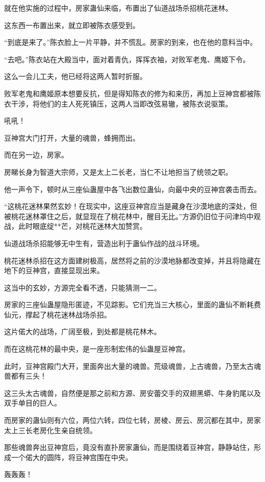 \begin{this_body}
就在他实施的过程中，房家蛊仙来临，布置出了仙道战场杀招桃花迷林。

这东西一布置出来，就立即被陈衣感受到。

“到底是来了。”陈衣脸上一片平静，并不慌乱。房家的到来，也在他的意料当中。

“去吧。”陈衣站在大殿当中，面对着青仇，挥挥衣袖，对败军老鬼、鹰姬下令。

这么一会儿工夫，他已经将这两人暂时折服。

败军老鬼和鹰姬原本想要反抗，但是得知陈衣的修为和来历，再加上豆神宫都被陈衣干涉，将他们的主人死死镇压，这两人当即改弦易辙，被陈衣说驱策。

吼吼！

豆神宫大门打开，大量的魂兽，蜂拥而出。

而在另一边，房家。

房睇长身为智道大宗师，又是太上二长老，当仁不让地担当了统领之职。

他一声令下，顿时从三座仙蛊屋中各飞出数位蛊仙，向最中央的豆神宫袭击而去。

“这桃花迷林果然玄妙！在现实中，这座豆神宫应当是藏身在沙漠地底的深处，但被桃花迷林罩住之后，就显现在了桃花林中，醒目无比。”方源仍旧位于问津坞中观战，此时眼底绽**芒，对桃花迷林大加赞赏。

仙道战场杀招能够无中生有，营造出利于蛊仙作战的战斗环境。

桃花迷林杀招在这方面建树极高，居然将之前的沙漠地脉都改变掉，并且将隐藏在地下的豆神宫，直接显现出来。

这当中的玄妙，方源完全看不透，只能猜测一二。

房家的三座仙蛊屋隐形匿迹，不见踪影。它们充当三大核心，里面的蛊仙不断耗费仙元，撑起了桃花迷林战场杀招。

这片偌大的战场，广阔至极，到处都是桃花林木。

而在这桃花林的最中央，是一座形制宏伟的仙蛊屋豆神宫。

此时，豆神宫殿门大开，里面奔出大量的魂兽。荒级魂兽，上古魂兽，乃至太古魂兽都有三头！

这三头太古魂兽，自然便是那之前和方源、房安蕾交手的双翅黑蟒、牛身豹尾以及双手单目的巨人。

而房家的蛊仙则有六位，两位六转，四位七转，房棱、房云、房沉都在其中，房家太上三长老房化生亲自统领。

那些魂兽奔出豆神宫后，竟没有直扑房家蛊仙，而是围绕着豆神宫，静静站住，形成一个偌大的圆阵，将豆神宫围在中央。

轰轰轰！


\end{this_body}
